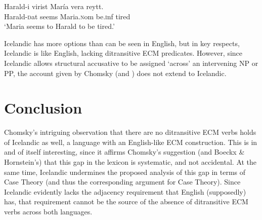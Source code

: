 \documentclass[output=paper]{LSP/langsci}
\begin{document}
\begin{exe}
\ex \label{handm} \gll Harald-i vir{\dh}ist Mar\'ia vera {\th}reytt. \\
Harald-{\textsc dat} seems Maria.{\textsc nom} be.{\textsc inf} tired \\
\glt `Maria seems to Harald to be tired.' 
\end{exe}

Icelandic has more options than can be seen in English, but in key respects, Icelandic is like English, lacking ditransitive ECM predicates. However, since Icelandic allows structural accusative to be assigned `across' an intervening NP or PP, the account given by Chomsky (and \citealt{boehorn05}) does not extend to Icelandic. 

\section{Conclusion}

Chomsky's intriguing observation that there are no ditransitive ECM verbs holds of Icelandic as well, a language with an English-like ECM construction. This is in and of itself interesting, since it affirms Chomsky's suggestion (and Boeckx \& Hornstein's) that this gap in the lexicon is systematic, and not accidental. At the same time, Icelandic undermines the proposed analysis of this gap in terms of Case Theory (and thus the corresponding argument for Case Theory). Since Icelandic evidently lacks the adjacency requirement that English (supposedly) has, that requirement cannot be the source of the absence of ditransitive ECM verbs across both languages. 
\end{document}
